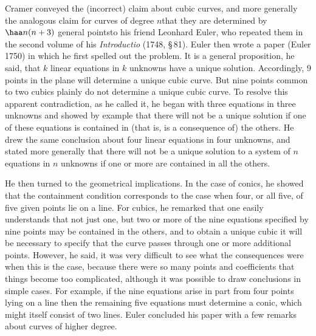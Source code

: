Cramer conveyed the (incorrect) claim about cubic curves, and more
generally the analogous claim for curves of degree $n$\emdash  that
they are determined by $\haa n(n+3)$ general points\emdash  to his
friend Leonhard Euler,
%
 who repeated  them in the second volume of his
\emph{Introductio} (1748, \S\,81). Euler then wrote a paper (Euler
1750) in which he first spelled out the problem. It is a general
proposition, he said, that $k$ linear equations in $k$ unknowns have
a unique solution. Accordingly, 9 points in the plane will determine a
unique cubic curve. But nine points common to two cubics plainly do not
determine a unique cubic curve.
%
 To resolve this apparent contradiction,
as he called it, he began with  three equations in three unknowns and
showed by example that there will not be a unique solution if one of these
equations is contained in (that is, is a consequence of) the others. He
drew the same conclusion about four 
%
%
linear equations in four unknowns,
and stated more generally that there will not be a unique solution to
a system of $n$ equations in $n$ unknowns if one or more are contained
in all the others.

He then turned to the geometrical implications. In the case of conics,
he showed that the containment condition corresponds to the case when
four, or all five, of five given points lie on a line.  For cubics,
he remarked that one easily understands that not just one, but two or
more of the nine equations specified by nine points may be contained in
the others, and to obtain a unique cubic it will be necessary to specify
that the curve passes through one or more additional points.  However,
he said, it was very difficult to see what the consequences were when
this is the case, because there were so many points and coefficients
that things become too complicated, although it was possible to draw
conclusions in simple cases. For example, if the nine equations arise in
part from four points lying on a line then the remaining five equations
must determine a conic, which might itself consist of two lines. Euler
concluded his paper with a few remarks about curves of higher degree.


